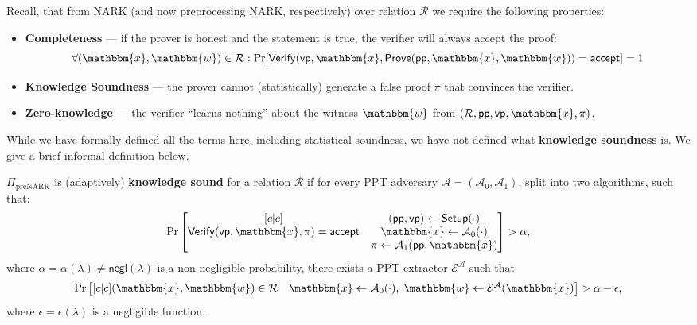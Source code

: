 \documentclass[../lecture-notes-148x210.tex]{subfiles}
\begin{document}
Recall, that from NARK (and now preprocessing NARK, respectively) over relation
$\mathcal{R}$ we require the following properties:
\begin{itemize}
    \item \textbf{Completeness} --- if the prover is honest and the statement is
    true, the verifier will always accept the proof:
    \begin{equation*}
        \forall (\mathbbm{x},\mathbbm{w}) \in \mathcal{R}: \text{Pr}[\mathsf{Verify}(\mathsf{vp}, \mathbbm{x}, \mathsf{Prove}(\mathsf{pp},\mathbbm{x},\mathbbm{w})) = \mathsf{accept}] = 1
    \end{equation*}
    \item \textbf{Knowledge Soundness} --- the prover cannot (statistically)
    generate a false proof $\pi$ that convinces the verifier. 
    \item \textbf{Zero-knowledge} --- the verifier ``learns nothing'' about the
    witness $\mathbbm{w}$ from $(\mathcal{R},\mathsf{pp},\mathsf{vp},\mathbbm{x},\pi)$.
\end{itemize}

While we have formally defined all the terms here, including statistical
soundness, we have not defined what \textbf{knowledge soundness} is. We give a
brief informal definition below.

\begin{definition}
    $\Pi_{\text{preNARK}}$ is (adaptively) \textbf{knowledge sound} for a
    relation $\mathcal{R}$ if for every PPT adversary
    $\mathcal{A}=(\mathcal{A}_0,\mathcal{A}_1)$, split into two algorithms, such
    that:
    \begin{equation*}
        \text{Pr}\begin{bmatrix}[c|c]
            & (\mathsf{pp},\mathsf{vp}) \gets \mathsf{Setup}(\cdot)\\
            \mathsf{Verify}(\mathsf{vp},\mathbbm{x},\pi)=\mathsf{accept} & \mathbbm{x} \gets \mathcal{A}_0(\cdot)  \\
            & \pi \gets \mathcal{A}_1(\mathsf{pp},\mathbbm{x})
        \end{bmatrix} > \alpha,
    \end{equation*}
    where $\alpha=\alpha(\lambda) \neq \mathsf{negl}(\lambda)$ is a
    non-negligible probability, there exists a PPT extractor
    $\mathcal{E}^{\mathcal{A}}$ such that
    \begin{equation*}
        \text{Pr}\begin{bmatrix}[c|c]
            (\mathbbm{x},\mathbbm{w}) \in \mathcal{R} & \mathbbm{x} \gets \mathcal{A}_0(\cdot), \; \mathbbm{w} \gets \mathcal{E}^{\mathcal{A}}(\mathbbm{x})
        \end{bmatrix} > \alpha - \epsilon,
    \end{equation*}
    where $\epsilon = \epsilon(\lambda)$ is a negligible function.
\end{definition}
\end{document}
